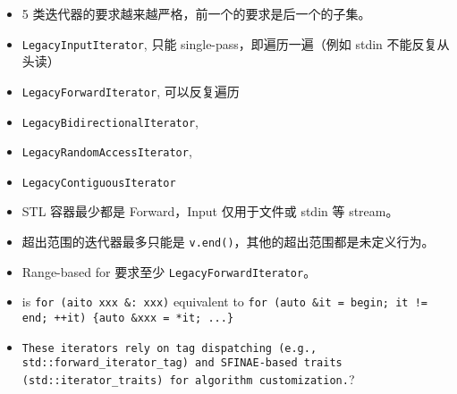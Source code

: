 
\begin{itemize}
\item 5 类迭代器的要求越来越严格，前一个的要求是后一个的子集。
\item \verb`LegacyInputIterator`, 只能 single-pass，即遍历一遍（例如 stdin 不能反复从头读）
\item \verb`LegacyForwardIterator`, 可以反复遍历
\item \verb`LegacyBidirectionalIterator`,
\item \verb`LegacyRandomAccessIterator`,
\item \verb`LegacyContiguousIterator`
\item STL 容器最少都是 Forward，Input 仅用于文件或 stdin 等 stream。
\item 超出范围的迭代器最多只能是 \verb`v.end()`，其他的超出范围都是未定义行为。
\item Range-based for 要求至少 \verb`LegacyForwardIterator`。
\item is \verb`for (aito xxx &: xxx)` equivalent to \verb`for (auto &it = begin; it != end; ++it) {auto &xxx = *it; ...}`
\item \verb`These iterators rely on tag dispatching (e.g., std::forward_iterator_tag) and SFINAE-based traits (std::iterator_traits) for algorithm customization.`?
\end{itemize}

